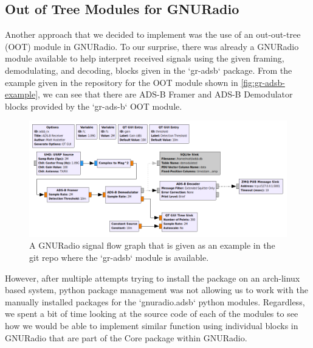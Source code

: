 \documentclass[journal, onecolumn]{IEEEtran}
\begin{document}
\subsection{Out of Tree Modules for GNURadio}
Another approach that we decided to implement was the use of an out-out-tree (OOT) module \cite{oot-adsb} in GNURadio.
To our surprise, there was already a GNURadio module available to help interpret received signals using the given framing, demodulating, and decoding, blocks given in the `gr-adsb` package.
From the example given in the repository for the OOT module shown in \autoref{fig:gr-adsb-example}, we can see that there are ADS-B Framer and ADS-B Demodulator blocks provided by the `gr-ads-b` OOT module. 

\begin{figure}
  \begin{center}
    \includegraphics[width=\textwidth]{./figures/adsb_rx.png}
  \end{center}
  \caption{A GNURadio signal flow graph that is given as an example in the git repo where the `gr-adsb` module is available.}\label{fig:gr-adsb-example}
\end{figure}

However, after multiple attempts trying to install the package on an arch-linux based system, python package management was not allowing us to work with the manually installed packages for the `gnuradio.adsb` python modules.
Regardless, we spent a bit of time looking at the source code of each of the modules to see how we would be able to implement similar function using individual blocks in GNURadio that are part of the Core package within GNURadio.


\end{document}
